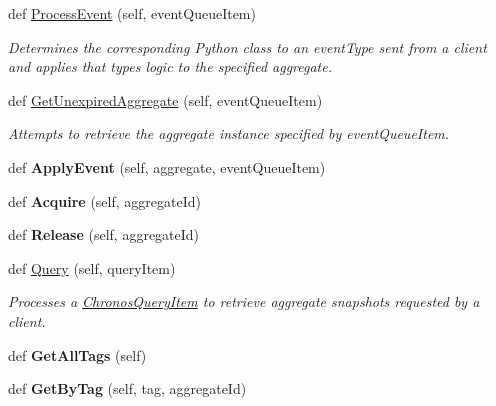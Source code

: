 \begin{DoxyCompactItemize}
\item 
def \hyperlink{group__Chronos_ga5ae412d35ae2277be0ea6d2013d12129}{Process\+Event} (self, event\+Queue\+Item)
\begin{DoxyCompactList}\small\item\em Determines the corresponding Python class to an event\+Type sent from a client and applies that type\textquotesingle{}s logic to the specified aggregate. \end{DoxyCompactList}\item 
def \hyperlink{group__Chronos_ga886ff894876545d6abaa78d677386d36}{Get\+Unexpired\+Aggregate} (self, event\+Queue\+Item)
\begin{DoxyCompactList}\small\item\em Attempts to retrieve the aggregate instance specified by event\+Queue\+Item. \end{DoxyCompactList}\item 
def {\bfseries Apply\+Event} (self, aggregate, event\+Queue\+Item)
\item 
def {\bfseries Acquire} (self, aggregate\+Id)
\item 
def {\bfseries Release} (self, aggregate\+Id)
\item 
def \hyperlink{group__Chronos_ga4c27fcd186b8c17d47b2d6a6d0dd8d55}{Query} (self, query\+Item)
\begin{DoxyCompactList}\small\item\em Processes a \hyperlink{classChronos_1_1Gateway_1_1ChronosQueryItem}{Chronos\+Query\+Item} to retrieve aggregate snapshots requested by a client. \end{DoxyCompactList}\item 
def {\bfseries Get\+All\+Tags} (self)
\item 
def {\bfseries Get\+By\+Tag} (self, tag, aggregate\+Id)
\end{DoxyCompactItemize}
